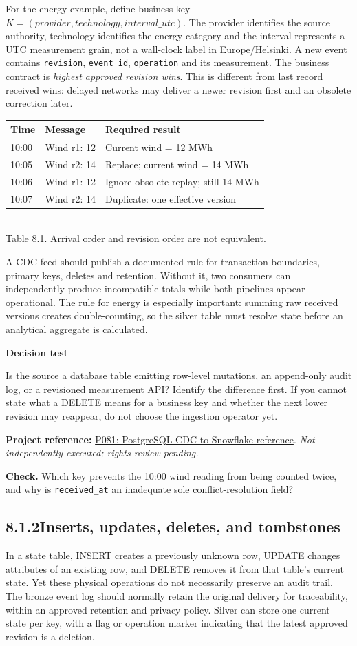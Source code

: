 \documentclass[11pt,twoside]{article}
\newcommand{\topic}[2]{\subsection*{#1\quad #2}}
\newcommand{\repo}[2]{\par\begingroup\fontsize{8.0}{9.6}\selectfont\sffamily\color{inkgray}\textbf{Project reference:} \href{#2}{#1}. \textit{Not independently executed; rights review pending.}\par\endgroup}
\begin{document}
For the energy example, define business key \(K=(provider,technology,interval\_utc)\). The provider identifies the source authority, technology identifies the energy category and the interval represents a UTC measurement grain, not a wall-clock label in Europe/Helsinki. A new event contains \texttt{revision}, \texttt{event\_id}, \texttt{operation} and its measurement. The business contract is \emph{highest approved revision wins}. This is different from last record received wins: delayed networks may deliver a newer revision first and an obsolete correction later.
\begin{center}\renewcommand{\arraystretch}{1.12}\begin{tabularx}{\linewidth}{@{}p{18mm}p{21mm}X@{}}\toprule
\textbf{Time}&\textbf{Message}&\textbf{Required result}\\\midrule
10:00&Wind r1: 12&Current wind = 12 MWh\\
10:05&Wind r2: 14&Replace; current wind = 14 MWh\\
10:06&Wind r1: 12&Ignore obsolete replay; still 14 MWh\\
10:07&Wind r2: 14&Duplicate: one effective version\\\bottomrule
\end{tabularx}\\{\fontsize{8}{9.5}\selectfont\color{inkgray}Table 8.1. Arrival order and revision order are not equivalent.}\end{center}
A CDC feed should publish a documented rule for transaction boundaries, primary keys, deletes and retention. Without it, two consumers can independently produce incompatible totals while both pipelines appear operational. The rule for energy is especially important: summing raw received versions creates double-counting, so the silver table must resolve state before an analytical aggregate is calculated.
\begin{whitebox}\textbf{Decision test}\par
Is the source a database table emitting row-level mutations, an append-only audit log, or a revisioned measurement API? Identify the difference first. If you cannot state what a DELETE means for a business key and whether the next lower revision may reappear, do not choose the ingestion operator yet.\end{whitebox}
\repo{P081: PostgreSQL CDC to Snowflake reference}{https://github.com/Snowflake-Labs/sfguide-intro-to-cdc-using-snowflake-postgres-connector-dynamic-tables}
\textbf{Check.} Which key prevents the 10:00 wind reading from being counted twice, and why is \texttt{received\_at} an inadequate sole conflict-resolution field?
\newpage
\topic{8.1.2}{Inserts, updates, deletes, and tombstones}
In a state table, INSERT creates a previously unknown row, UPDATE changes attributes of an existing row, and DELETE removes it from that table's current state. Yet these physical operations do not necessarily preserve an audit trail. The bronze event log should normally retain the original delivery for traceability, within an approved retention and privacy policy. Silver can store one current state per key, with a flag or operation marker indicating that the latest approved revision is a deletion.
\end{document}
